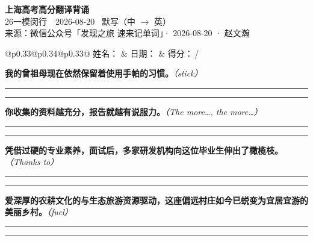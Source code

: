\documentclass[11pt,a4paper]{article}
\newcommand{\num}[1]{\makebox[1.9em][r]{#1.}\hspace{0.3em}}
\newcommand{\wline}{\noindent\rule{\linewidth}{0.4pt}}
\newcommand{\prompt}[1]{\emph{\textcolor{tipblue}{\small（#1）}}}
\begin{document}
\pagestyle{plain}
\begin{center}
{\LARGE\bfseries 上海高考高分翻译背诵 }\\[0.25em]
{\large 26一模闵行　2026-08-20 \quad\ 默写（中 $\to$ 英）}\\[0.35em]
{\footnotesize 来源：微信公众号「发现之旅 速来记单词」· 2026-08-20 · 赵文瀚}
\end{center}

\vspace{0.4em}
\noindent\begin{tabular}{@{}p{0.33\textwidth}@{}p{0.34\textwidth}@{}p{0.33\textwidth}@{}}
姓名：\underline{\hspace{2.0cm}} & 日期：\underline{\hspace{2.0cm}} & 得分：\underline{\hspace{1.4cm}}\,/ \\
\end{tabular}

\vspace{0.5em}

\vspace{0.8em}
\num{1}\textbf{我的曾祖母现在依然保留着使用手帕的习惯。}\prompt{stick}

\vspace{0.3em}

\wline\vspace{0.3em}
\wline

\num{2}\textbf{你收集的资料越充分，报告就越有说服力。}\prompt{The more…, the more…}

\vspace{0.3em}

\wline\vspace{0.3em}
\wline

\num{3}\textbf{凭借过硬的专业素养，面试后，多家研发机构向这位毕业生伸出了橄榄枝。}\prompt{Thanks to}

\vspace{0.3em}

\wline\vspace{0.3em}
\wline

\num{4}\textbf{爱深厚的农耕文化的与生态旅游资源驱动，这座偏远村庄如今已蜕变为宜居宜游的美丽乡村。}\prompt{fuel}

\vspace{0.3em}

\wline\vspace{0.3em}
\wline
\end{document}
